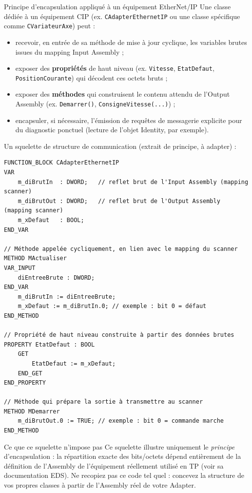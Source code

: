 \begin{UPSTIidee}{Principe d'encapsulation appliqué à un équipement EtherNet/IP}
    Une classe dédiée à un équipement CIP (ex. \texttt{CAdapterEthernetIP} ou une classe spécifique comme \texttt{CVariateurAxe}) peut :
    \begin{itemize}
        \item recevoir, en entrée de sa méthode de mise à jour cyclique, les variables brutes issues du mapping Input Assembly ;
        \item exposer des \textbf{propriétés} de haut niveau (ex. \texttt{Vitesse}, \texttt{EtatDefaut}, \texttt{PositionCourante}) qui décodent ces octets bruts ;
        \item exposer des \textbf{méthodes} qui construisent le contenu attendu de l'Output Assembly (ex. \texttt{Demarrer()}, \texttt{ConsigneVitesse(...)}) ;
        \item encapsuler, si nécessaire, l'émission de requêtes de messagerie explicite pour du diagnostic ponctuel (lecture de l'objet Identity, par exemple).
    \end{itemize}
\end{UPSTIidee}

Un squelette de structure de communication (extrait de principe, à adapter) :

\begin{lstlisting}[caption={Squelette d'une classe encapsulant un échange cyclique via Assembly}]
FUNCTION_BLOCK CAdapterEthernetIP
VAR
    m_diBrutIn  : DWORD;   // reflet brut de l'Input Assembly (mapping scanner)
    m_diBrutOut : DWORD;   // reflet brut de l'Output Assembly (mapping scanner)
    m_xDefaut   : BOOL;
END_VAR

// Méthode appelée cycliquement, en lien avec le mapping du scanner
METHOD MActualiser
VAR_INPUT
    diEntreeBrute : DWORD;
END_VAR
    m_diBrutIn := diEntreeBrute;
    m_xDefaut := m_diBrutIn.0; // exemple : bit 0 = défaut
END_METHOD

// Propriété de haut niveau construite à partir des données brutes
PROPERTY EtatDefaut : BOOL
    GET
        EtatDefaut := m_xDefaut;
    END_GET
END_PROPERTY

// Méthode qui prépare la sortie à transmettre au scanner
METHOD MDemarrer
    m_diBrutOut.0 := TRUE; // exemple : bit 0 = commande marche
END_METHOD
\end{lstlisting}

\begin{UPSTIinfor}{Ce que ce squelette n'impose pas}
    Ce squelette illustre uniquement le \emph{principe} d'encapsulation : la répartition exacte des bits/octets dépend entièrement de la définition de l'Assembly de l'équipement réellement utilisé en TP (voir sa documentation EDS). Ne recopiez pas ce code tel quel : concevez la structure de vos propres classes à partir de l'Assembly réel de votre Adapter.
\end{UPSTIinfor}
